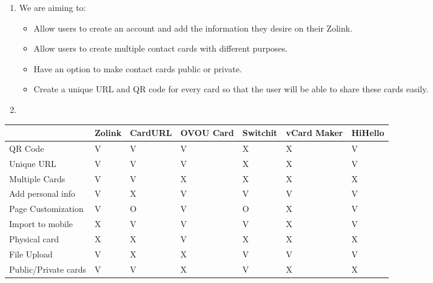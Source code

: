 \documentclass[12pt]{article}%
\begin{document}
\begin{enumerate}
\begin{enumerate}
            \item We are aiming to:
            \begin{itemize}
            	\item Allow users to create an account and add the information they desire on their Zolink.
            	\item Allow users to create multiple contact cards with different purposes.
            	\item Have an option to make contact cards public or private.
            	\item Create a unique URL and QR code for every card so that the user will be able to share these cards easily.
            \end{itemize}
            \item
        \end{enumerate}
\end{enumerate}

\begin{center}
    \begin{tabular}{|l|l|l|l|l|l|l|}
        \hline
         & Zolink & CardURL & OVOU Card & Switchit & vCard Maker & HiHello \\
         \hline
        QR Code & V & V & V & X & X & V \\
        \hline
        Unique URL & V & V & V & X & X & V \\
        \hline
        Multiple Cards & V & V & X & X & X & X \\
        \hline
        Add personal info & V & X & V & V & V & V \\
        \hline
        Page Customization & V & O & V & O & X & V \\
        \hline
        Import to mobile & X & V & V & V & X & V \\
        \hline
        Physical card & X & X & V & X & X & X \\
        \hline
        File Upload & V & X & X & V & V & V \\
        \hline
        Public/Private cards & V & V & X & V & X & X \\
        \hline
    \end{tabular}
\end{center}
\end{document}
